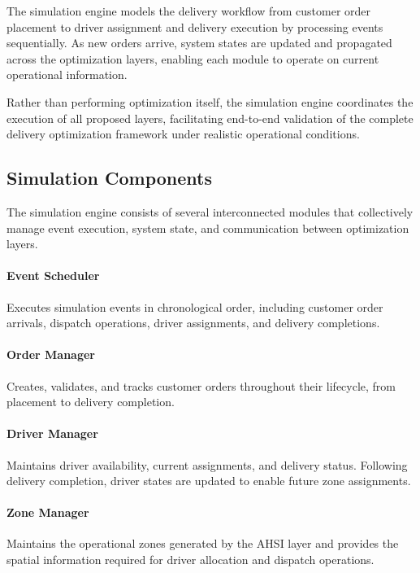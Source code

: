 \documentclass{article}
\begin{document}
The simulation engine models the delivery workflow from customer order placement to driver assignment and delivery execution by processing events sequentially. As new orders arrive, system states are updated and propagated across the optimization layers, enabling each module to operate on current operational information.

Rather than performing optimization itself, the simulation engine coordinates the execution of all proposed layers, facilitating end-to-end validation of the complete delivery optimization framework under realistic operational conditions.

\subsection{Simulation Components}
\label{subsec:simulation_components}

The simulation engine consists of several interconnected modules that collectively manage event execution, system state, and communication between optimization layers.

\paragraph{Event Scheduler}
Executes simulation events in chronological order, including customer order arrivals, dispatch operations, driver assignments, and delivery completions.

\paragraph{Order Manager}
Creates, validates, and tracks customer orders throughout their lifecycle, from placement to delivery completion.

\paragraph{Driver Manager}
Maintains driver availability, current assignments, and delivery status. Following delivery completion, driver states are updated to enable future zone assignments.

\paragraph{Zone Manager}
Maintains the operational zones generated by the AHSI layer and provides the spatial information required for driver allocation and dispatch operations.
\end{document}
